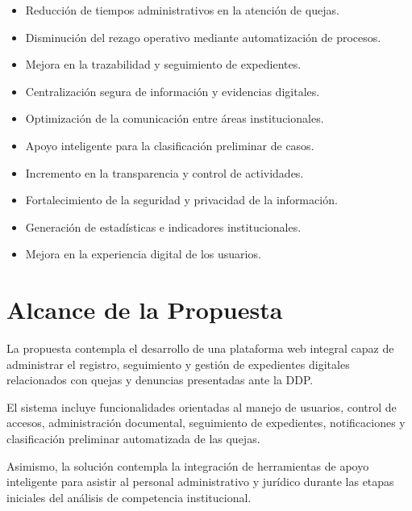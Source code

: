 \begin{itemize}

    \item Reducción de tiempos administrativos en la atención de quejas.

    \item Disminución del rezago operativo mediante automatización de procesos.

    \item Mejora en la trazabilidad y seguimiento de expedientes.

    \item Centralización segura de información y evidencias digitales.

    \item Optimización de la comunicación entre áreas institucionales.

    \item Apoyo inteligente para la clasificación preliminar de casos.

    \item Incremento en la transparencia y control de actividades.

    \item Fortalecimiento de la seguridad y privacidad de la información.

    \item Generación de estadísticas e indicadores institucionales.

    \item Mejora en la experiencia digital de los usuarios.

\end{itemize}

\section{Alcance de la Propuesta}

La propuesta contempla el desarrollo de una plataforma web integral capaz de administrar el registro, seguimiento y gestión de expedientes digitales relacionados con quejas y denuncias presentadas ante la DDP.

El sistema incluye funcionalidades orientadas al manejo de usuarios, control de accesos, administración documental, seguimiento de expedientes, notificaciones y clasificación preliminar automatizada de las quejas.

Asimismo, la solución contempla la integración de herramientas de apoyo inteligente para asistir al personal administrativo y jurídico durante las etapas iniciales del análisis de competencia institucional.

